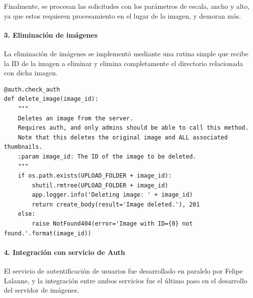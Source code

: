 \documentclass[11pt,letterpaper]{article}
\begin{document}
Finalmente, se procesan las solicitudes con los parámetros de escala, ancho y alto, ya que estos requieren procesamiento en el lugar de la imagen, y demoran más.

\paragraph{3. Eliminación de imágenes}

La eliminación de imágenes se implementó mediante una rutina simple que recibe la ID de la imagen a eliminar y elimina completamente el directorio relacionada con dicha imagen.

\begin{lstlisting}
@auth.check_auth
def delete_image(image_id):
    """
    Deletes an image from the server.
    Requires auth, and only admins should be able to call this method.
    Note that this deletes the original image and ALL associated thumbnails.
    :param image_id: The ID of the image to be deleted.
    """
    if os.path.exists(UPLOAD_FOLDER + image_id):
        shutil.rmtree(UPLOAD_FOLDER + image_id)
        app.logger.info('Deleting image: ' + image_id)
        return create_body(result='Image deleted.'), 201
    else:
        raise NotFound404(error='Image with ID={0} not found.'.format(image_id))
\end{lstlisting}

\paragraph{4. Integración con servicio de Auth}

El servicio de autentificación de usuarios fue desarrollado en paralelo por Felipe Lalanne, y la integración entre ambos servicios fue el último paso en el desarrollo del servidor de imágenes. \\
\end{document}
